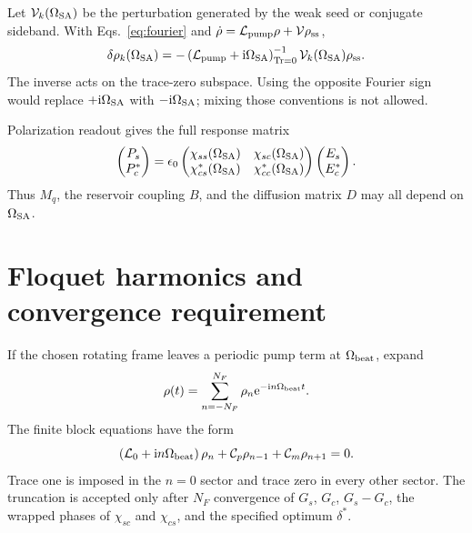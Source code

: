 \documentclass[11pt,a4paper]{article}
\newcommand{\ii}{\mathrm i}
\newcommand{\e}{\mathrm e}
\newcommand{\Tr}{\operatorname{Tr}}
\begin{document}
Let $\mathcal V_k(\Omega_{\rm SA})$ be the perturbation generated by the weak
seed or conjugate sideband. With Eqs.~\eqref{eq:fourier} and
$\dot\rho=\mathcal L_{\rm pump}\rho+\mathcal V\rho_{\rm ss}$,
\begin{equation}
\delta\rho_k(\Omega_{\rm SA})=
-\left(\mathcal L_{\rm pump}+\ii\Omega_{\rm SA}\right)^{-1}_{\Tr=0}
\mathcal V_k(\Omega_{\rm SA})\rho_{\rm ss}.
\label{eq:linear-resolvent}
\end{equation}
The inverse acts on the trace-zero subspace. Using the opposite Fourier sign
would replace $+\ii\Omega_{\rm SA}$ with $-\ii\Omega_{\rm SA}$; mixing those
conventions is not allowed.

Polarization readout gives the full response matrix
\begin{equation}
\begin{pmatrix}P_s\\P_c^*\end{pmatrix}
=\epsilon_0
\begin{pmatrix}
\chi_{ss}(\Omega_{\rm SA})&\chi_{sc}(\Omega_{\rm SA})\\
\chi_{cs}^*(\Omega_{\rm SA})&\chi_{cc}^*(\Omega_{\rm SA})
\end{pmatrix}
\begin{pmatrix}E_s\\E_c^*\end{pmatrix}.
\label{eq:chi-matrix}
\end{equation}
Thus $M_q$, the reservoir coupling $B$, and the diffusion matrix $D$ may all
depend on $\Omega_{\rm SA}$.

\section{Floquet harmonics and convergence requirement}

If the chosen rotating frame leaves a periodic pump term at
$\Omega_{\rm beat}$, expand
\[
\rho(t)=\sum_{n=-N_F}^{N_F}\rho_n\e^{-\ii n\Omega_{\rm beat}t}.
\]
The finite block equations have the form
\begin{equation}
\left(\mathcal L_0+\ii n\Omega_{\rm beat}\right)\rho_n
+\mathcal C_p\rho_{n-1}+\mathcal C_m\rho_{n+1}=0 .
\label{eq:floquet-block}
\end{equation}
Trace one is imposed in the $n=0$ sector and trace zero in every other sector.
The truncation is accepted only after $N_F$ convergence of $G_s$, $G_c$,
$G_s-G_c$, the wrapped phases of $\chi_{sc}$ and $\chi_{cs}$, and the
specified optimum $\delta^\ast$.
\end{document}
